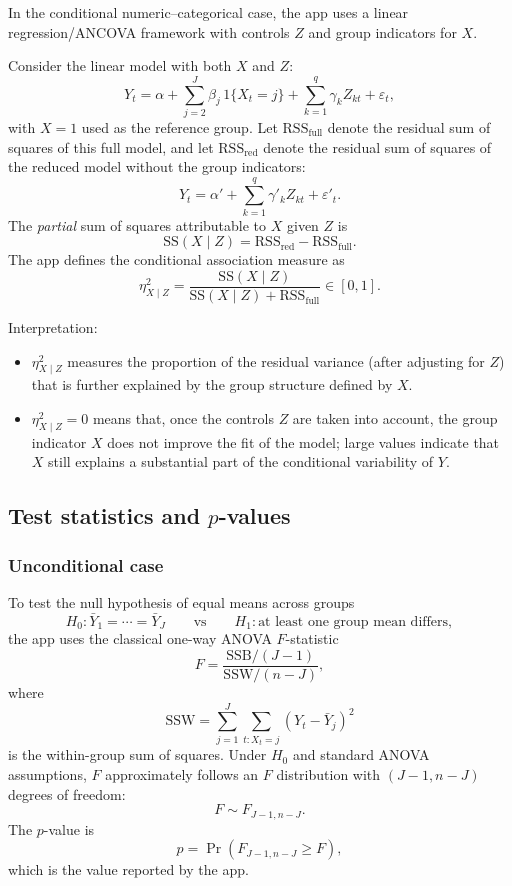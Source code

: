 \documentclass[11pt,a4paper]{article}
\begin{document}
In the conditional numeric--categorical case, the app uses a linear regression/ANCOVA framework with controls $Z$ and group indicators for $X$.

Consider the linear model with both $X$ and $Z$:
\[
  Y_t = \alpha + \sum_{j=2}^J \beta_j \, 1\{X_t = j\} + \sum_{k=1}^q \gamma_k Z_{kt} + \varepsilon_t,
\]
with $X=1$ used as the reference group. Let $\mathrm{RSS}_{\text{full}}$ denote the residual sum of squares of this full model, and let $\mathrm{RSS}_{\text{red}}$ denote the residual sum of squares of the reduced model without the group indicators:
\[
  Y_t = \alpha' + \sum_{k=1}^q \gamma'_k Z_{kt} + \varepsilon'_t.
\]
The \emph{partial} sum of squares attributable to $X$ given $Z$ is
\[
  \mathrm{SS}(X \mid Z) = \mathrm{RSS}_{\text{red}} - \mathrm{RSS}_{\text{full}}.
\]
The app defines the conditional association measure as
\[
  \eta^2_{X\mid Z} = \frac{\mathrm{SS}(X \mid Z)}{\mathrm{SS}(X \mid Z) + \mathrm{RSS}_{\text{full}}} \in [0,1].
\]

Interpretation:
\begin{itemize}
  \item $\eta^2_{X\mid Z}$ measures the proportion of the residual variance (after adjusting for $Z$) that is further explained by the group structure defined by $X$.
  \item $\eta^2_{X\mid Z} = 0$ means that, once the controls $Z$ are taken into account, the group indicator $X$ does not improve the fit of the model; large values indicate that $X$ still explains a substantial part of the conditional variability of $Y$.
\end{itemize}

\subsection{Test statistics and $p$-values}

\subsubsection*{Unconditional case}

To test the null hypothesis of equal means across groups
\[
  H_0: \bar{Y}_1 = \cdots = \bar{Y}_J \qquad \text{vs} \qquad H_1: \text{at least one group mean differs},
\]
the app uses the classical one-way ANOVA $F$-statistic
\[
  F = \frac{\mathrm{SSB}/(J-1)}{\mathrm{SSW}/(n-J)},
\]
where
\[
  \mathrm{SSW} = \sum_{j=1}^J \sum_{t: X_t=j} (Y_t - \bar{Y}_j)^2
\]
is the within-group sum of squares. Under $H_0$ and standard ANOVA assumptions, $F$ approximately follows an $F$ distribution with $(J-1, n-J)$ degrees of freedom:
\[
  F \sim F_{J-1, n-J}.
\]
The $p$-value is
\[
  p = \Pr\left( F_{J-1, n-J} \ge F \right),
\]
which is the value reported by the app.
\end{document}
